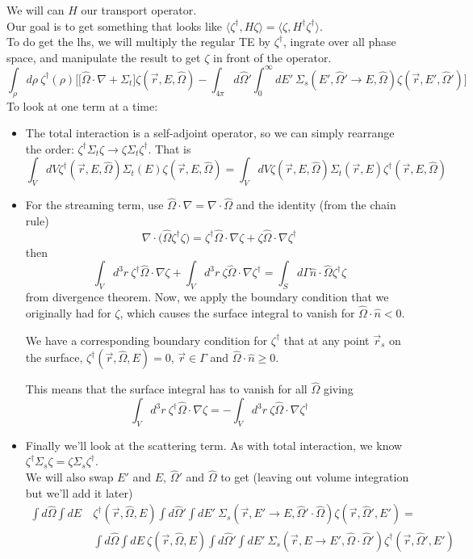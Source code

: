 \documentclass[12pt]{article}
\newcommand{\rvec}{\ensuremath{\vec{r}}}
\newcommand{\vOmega}{\ensuremath{\hat{\Omega}}}
\begin{document}
We will can $H$ our transport operator.\\
Our goal is to get something that looks like $\langle\zeta^{\dagger}, H \zeta\rangle = \langle\zeta, H^{\dagger} \zeta^{\dagger}\rangle$.\\


To do get the lhs, we will multiply the regular TE by $\zeta^{\dagger}$, ingrate over all phase space, and manipulate the result to get $\zeta$ in front of the operator.
%
\[\int_{\rho} d\rho\: \zeta^{\dagger}(\rho)\biggl[ \bigl[\vOmega \cdot \nabla + \Sigma_t\bigr] \zeta(\vec{r}, E, \vOmega) - \int_{4 \pi} d\vOmega' \int_0^{\infty} dE' \: \Sigma_s(E', \vOmega' \rightarrow E, \vOmega) \zeta(\vec{r}, E', \vOmega') \biggr]\]
% 
To look at one term at a time:
\begin{itemize}
\item The total interaction is a self-adjoint operator, so we can simply rearrange the order: $\zeta^{\dagger} \Sigma_t \zeta \rightarrow \zeta \Sigma_t \zeta^{\dagger}$. That is
\[\int_V dV \zeta^{\dagger}(\vec{r}, E, \vOmega) \Sigma_t(E) \zeta(\vec{r}, E, \vOmega) = \int_V dV \zeta(\vec{r}, E, \vOmega) \Sigma_t(\rvec,E) \zeta^{\dagger}(\vec{r}, E, \vOmega)\]
%
\item For the streaming term, use $\vOmega \cdot \nabla = \nabla \cdot \vOmega$ and the identity (from the chain rule)
\[\nabla \cdot \bigl(\vOmega \zeta^{\dagger} \zeta \bigr) = \zeta^{\dagger}\vOmega \cdot \nabla \zeta + \zeta \vOmega \cdot \nabla \zeta^{\dagger}\]
then
\[
\int_V d^3r \:\zeta^{\dagger}\vOmega \cdot \nabla \zeta + \int_V d^3r \:\zeta \vOmega \cdot \nabla \zeta^{\dagger} = \int_S d \Gamma \hat{n} \cdot \vOmega \zeta^{\dagger} \zeta
\]
from divergence theorem. Now, we apply the boundary condition that we originally had for $\zeta$, which causes the surface integral to vanish for $\vOmega \cdot \hat{n} < 0$.

We have a corresponding boundary condition for $\zeta^{\dagger}$ that at any point $\rvec_s$ on the surface, $\zeta^{\dagger}(\rvec, \vOmega, E) = 0$, $\vec{r} \in \Gamma$ and $\vOmega \cdot \hat{n} \geq 0$.

This means that the surface integral has to vanish for all $\vOmega$ giving
\[
\int_V d^3r \:\zeta^{\dagger}\vOmega \cdot \nabla \zeta = -\int_V d^3r \:\zeta \vOmega \cdot \nabla \zeta^{\dagger}
\]
%
\item Finally we'll look at the scattering term. As with total interaction, we know $\zeta^{\dagger} \Sigma_s \zeta  = \zeta \Sigma_s \zeta^{\dagger}$. \\
We will also swap $E'$ and $E$, $\vOmega'$ and $\vOmega$ to get (leaving out volume integration but we'll add it later)
\begin{align*}
\int d\vOmega \int dE\: &\zeta^{\dagger}(\rvec, \vOmega, E) \int d\vOmega' \int dE'\: \Sigma_s(\rvec, E' \rightarrow E, \vOmega' \cdot \vOmega) \zeta(\rvec, \vOmega', E') = \\
%
&\int d\vOmega \int dE\: \zeta(\rvec, \vOmega, E) \int d\vOmega' \int dE'\: \Sigma_s(\rvec, E \rightarrow E', \vOmega \cdot \vOmega') \zeta^{\dagger}(\rvec, \vOmega', E') 
\end{align*}
\end{itemize}
\end{document}
